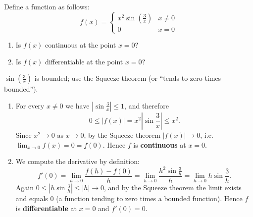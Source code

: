 
\begin{question}
Define a function as follows:
\[ f(x)=\begin{cases} x^2\sin\left(\frac{3}{x}\right) & x\neq0\\ 0 & x=0\end{cases} \]
\begin{enumerate}
  \item Is $f(x)$ continuous at the point $x=0$?
  \item Is $f(x)$ differentiable at the point $x=0$?
\end{enumerate}
\end{question}

\begin{hint}
$\sin\left(\frac3x\right)$ is bounded; use the Squeeze theorem (or ``tends to zero times bounded'').
\end{hint}

\begin{solution}
\begin{enumerate}
  \item For every $x\neq0$ we have $\left|\sin\frac3x\right|\le1$, and therefore
  \[ 0\le |f(x)|=x^2\left|\sin\frac3x\right|\le x^2. \]
  Since $x^2\to0$ as $x\to0$, by the Squeeze theorem $|f(x)|\to0$, i.e. $\lim_{x\to0}f(x)=0=f(0)$. Hence $f$ is \textbf{continuous} at $x=0$.
  \item We compute the derivative by definition:
  \[ f'(0)=\lim_{h\to0}\frac{f(h)-f(0)}{h}=\lim_{h\to0}\frac{h^2\sin\frac3h}{h}=\lim_{h\to0}h\sin\frac3h. \]
  Again $0\le\left|h\sin\frac3h\right|\le|h|\to0$, and by the Squeeze theorem the limit exists and equals $0$ (a function tending to zero times a bounded function). Hence $f$ is \textbf{differentiable} at $x=0$ and $f'(0)=0$.
\end{enumerate}
\end{solution}
